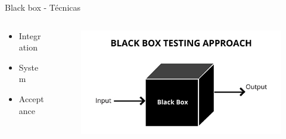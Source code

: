 \documentclass{beamer}
\begin{document}
\begin{frame}{Black box - Técnicas}
\begin{columns}[T]
\begin{column}[T]{4cm}
\begin{itemize}
\item Integration
\item System
\item Acceptance
\end{itemize}
\end{column}
\begin{column}[T]{6cm} %
\begin{figure}
\centering
\includegraphics[width=\linewidth]{Images/blackboxtesting.jpg}
\end{figure}
\end{column}
\end{columns}
\end{frame}
\end{document}
